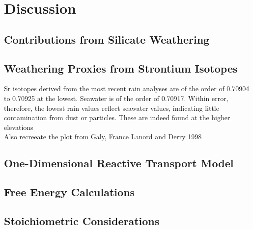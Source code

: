 

\section{Discussion}


\subsection{Contributions from Silicate Weathering}





\subsection{Weathering Proxies from Strontium Isotopes}

Sr isotopes derived from the most recent rain analyses are of the order of 0.70904 to 0.70925 at the lowest. Seawater is of the order of 0.70917. Within error, therefore, the lowest rain values reflect seawater values, indicating little contamination from dust or particles. These are indeed found at the higher elevations \\


Also recreeate the plot from Galy, France Lanord and Derry 1998



\subsection{One-Dimensional Reactive Transport Model}



\subsection{Free Energy Calculations}



\subsection{Stoichiometric Considerations}













